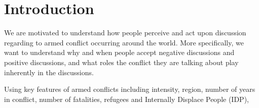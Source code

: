 \section{Introduction}
We are motivated to understand how people perceive and act upon discussion regarding to armed conflict occurring around the world. More specifically, we want to understand why and when people accept negative discussions and positive discussions, and what roles the conflict they are talking about play inherently in the discussions. 

Using key features of armed conflicts including intensity, region, number of years in conflict, number of fatalities, refugees and Internally Displace People (IDP),